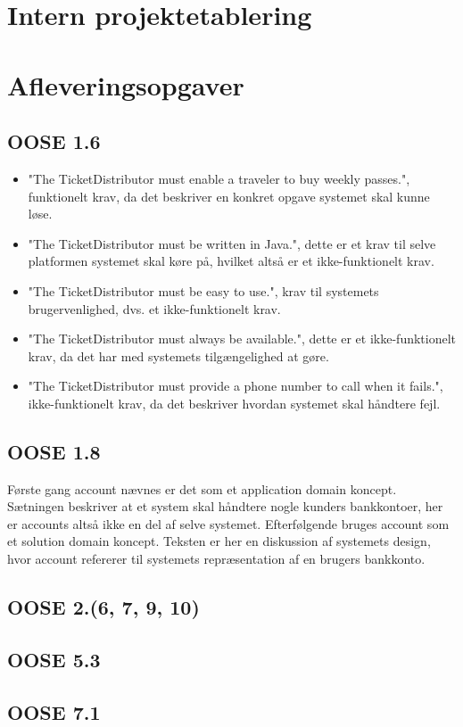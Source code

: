 \documentclass[12pt]{article}
\begin{document}
\section{Intern projektetablering}

\section{Afleveringsopgaver}
\subsection{OOSE 1.6}
\begin{itemize}
\item "The TicketDistributor must enable a traveler to buy weekly passes.",	funktionelt krav, da det beskriver en konkret opgave systemet skal kunne løse.
\item "The TicketDistributor must be written in Java.", dette er et krav til selve platformen systemet skal køre på, hvilket altså er et ikke-funktionelt krav.
\item "The TicketDistributor must be easy to use.", krav til systemets brugervenlighed, dvs. et ikke-funktionelt krav.
\item "The TicketDistributor must always be available.", dette er et ikke-funktionelt krav, da det har med systemets tilgængelighed at gøre.
\item "The TicketDistributor must provide a phone number to call when it fails.", ikke-funktionelt krav, da det beskriver hvordan systemet skal håndtere fejl.
\end{itemize}
\subsection{OOSE 1.8}
Første gang account nævnes er det som et application domain koncept. Sætningen beskriver at et system skal håndtere nogle kunders bankkontoer, her er accounts altså ikke en del af selve systemet. Efterfølgende bruges account som et solution domain koncept. Teksten er her en diskussion af systemets design, hvor account refererer til systemets repræsentation af en brugers bankkonto.
\subsection{OOSE 2.(6, 7, 9, 10)}
\subsection{OOSE 5.3}
\subsection{OOSE 7.1}
\end{document}
